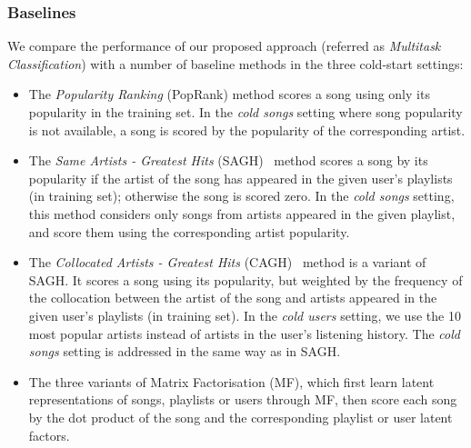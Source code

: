 \subsubsection{Baselines}
We compare the performance of our proposed approach (referred as {\it Multitask Classification}) 
with a number of baseline methods in the three cold-start settings:
\begin{itemize}
\item The {\it Popularity Ranking} (PopRank) method scores a song using only its popularity in the training set.
      In the \emph{cold songs} setting where song popularity is not available, 
      a song is scored by the popularity of the corresponding artist.
\item The {\it Same Artists - Greatest Hits} (SAGH)~\cite{mcfee2012million} method scores a song
      by its popularity if the artist of the song has appeared in the given user's playlists (in training set);
      otherwise the song is scored zero.
      In the {\it cold songs} setting, this method considers only songs from artists appeared in the given playlist,
      and score them using the corresponding artist popularity.
\item The {\it Collocated Artists - Greatest Hits} (CAGH)~\cite{bonnin2013evaluating} method is a variant of SAGH.
      It scores a song using its popularity, but weighted by the frequency of the collocation between the artist of the song
      and artists appeared in the given user's playlists (in training set).
      In the \emph{cold users} setting, we use the 10 most popular artists instead of artists in the user's listening history.
      The \emph{cold songs} setting is addressed in the same way as in SAGH.
\item The three variants of Matrix Factorisation (MF), which first learn latent representations of songs, playlists or users
      through MF, then score each song by the dot product of the song and the corresponding playlist or user latent factors.

\end{itemize}
